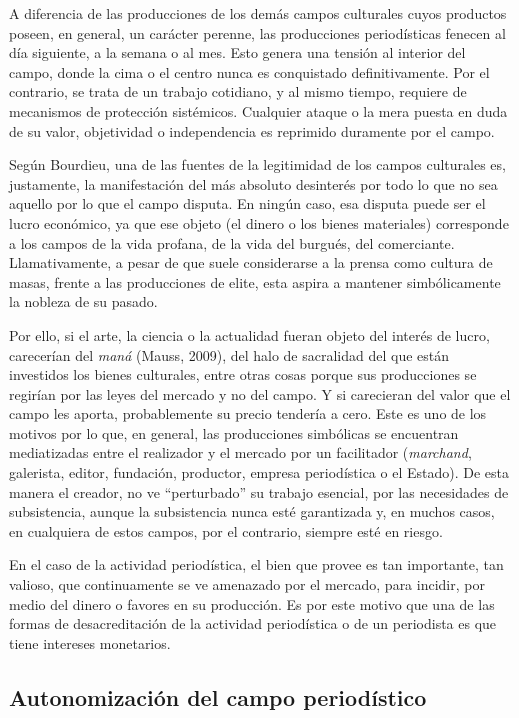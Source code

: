 A diferencia de las producciones de los demás campos culturales cuyos productos poseen, en general, un carácter perenne, las producciones periodísticas fenecen al día siguiente, a la semana o al mes. Esto genera una tensión al interior del campo, donde la cima o el centro nunca es conquistado definitivamente. Por el contrario, se trata de un trabajo cotidiano, y al mismo tiempo, requiere de mecanismos de protección sistémicos. Cualquier ataque o la mera puesta en duda de su valor, objetividad o independencia es reprimido duramente por el campo.

Según Bourdieu, una de las fuentes de la legitimidad de los campos culturales es, justamente, la manifestación del más absoluto desinterés por todo lo que no sea aquello por lo que el campo disputa. En ningún caso, esa disputa puede ser el lucro económico, ya que ese objeto (el dinero o los bienes materiales) corresponde a los campos de la vida profana, de la vida del burgués, del comerciante. Llamativamente, a pesar de que suele considerarse a la prensa como cultura de masas, frente a las producciones de elite, esta aspira a mantener simbólicamente la nobleza de su pasado.

Por ello, si el arte, la ciencia o la actualidad fueran objeto del interés de lucro, carecerían del \emph{maná} (Mauss, 2009), del halo de sacralidad del que están investidos los bienes culturales, entre otras cosas porque sus producciones se regirían por las leyes del mercado y no del campo. Y si carecieran del valor que el campo les aporta, probablemente su precio tendería a cero. Este es uno de los motivos por lo que, en general, las producciones simbólicas se encuentran mediatizadas entre el realizador y el mercado por un facilitador (\emph{marchand}, galerista, editor, fundación, productor, empresa periodística o el Estado). De esta manera el creador, no ve ``perturbado'' su trabajo esencial, por las necesidades de subsistencia, aunque la subsistencia nunca esté garantizada y, en muchos casos, en cualquiera de estos campos, por el contrario, siempre esté en riesgo.

En el caso de la actividad periodística, el bien que provee es tan importante, tan valioso, que continuamente se ve amenazado por el mercado, para incidir, por medio del dinero o favores en su producción. Es por este motivo que una de las formas de desacreditación de la actividad periodística o de un periodista es que tiene intereses monetarios.

\subsection{Autonomización del campo periodístico}

